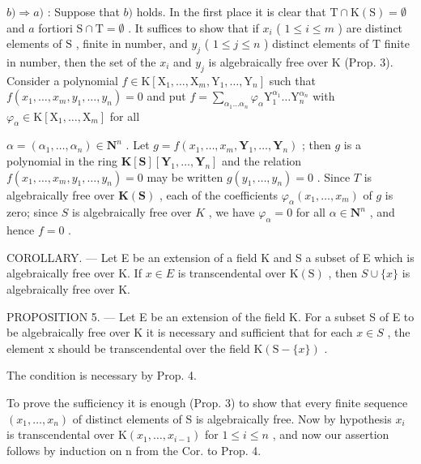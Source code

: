 \(b) \Rightarrow a)\) : Suppose that \(b)\) holds. In the first place it is clear that \(\mathrm{T} \cap \mathrm{K}(\mathrm{S}) = \emptyset\) and \(a\) fortiori \(\mathrm{S} \cap \mathrm{T} = \emptyset\) . It suffices to show that if \(x_i\) ( \(1 \leqslant i \leqslant m\) ) are distinct elements of \(\mathrm{S}\) , finite in number, and \(y_j\) ( \(1 \leqslant j \leqslant n\) ) distinct elements of \(\mathrm{T}\) finite in number, then the set of the \(x_i\) and \(y_j\) is algebraically free over \(\mathrm{K}\) (Prop. 3). Consider a polynomial \(f \in \mathrm{K}[\mathrm{X}_1, \ldots, \mathrm{X}_m, \mathrm{Y}_1, \ldots, \mathrm{Y}_n]\) such that \(f(x_1, \ldots, x_m, y_1, \ldots, y_n) = 0\) and put \(f = \sum_{\alpha_1 \ldots \alpha_n} \varphi_\alpha \mathrm{Y}_1^{\alpha_1} \ldots \mathrm{Y}_n^{\alpha_n}\) with \(\varphi_\alpha \in \mathrm{K}[\mathrm{X}_1, \ldots, \mathrm{X}_m]\) for all

\(\alpha = (\alpha_{1}, \ldots, \alpha_{n}) \in \mathbf{N}^{n}\) . Let \(g = f(x_{1}, \ldots, x_{m}, \mathbf{Y}_{1}, \ldots, \mathbf{Y}_{n})\) ; then \(g\) is a polynomial in the ring \(\mathbf{K}[\mathbf{S}][\mathbf{Y}_{1}, \ldots, \mathbf{Y}_{n}]\) and the relation \(f(x_{1}, \ldots, x_{m}, y_{1}, \ldots, y_{n}) = 0\) may be written \(g(y_{1}, \ldots, y_{n}) = 0\) . Since \(T\) is algebraically free over \(\mathbf{K}(\mathbf{S})\) , each of the coefficients \(\varphi_{\alpha}(x_{1}, \ldots, x_{m})\) of \(g\) is zero; since \(S\) is algebraically free over \(K\) , we have \(\varphi_{\alpha} = 0\) for all \(\alpha \in \mathbf{N}^{n}\) , and hence \(f = 0\) .

COROLLARY. --- Let E be an extension of a field K and S a subset of E which is algebraically free over K. If \(x \in E\) is transcendental over \(\mathrm{K}(\mathrm{S})\) , then \(S \cup \{x\}\) is algebraically free over K.

PROPOSITION 5. --- Let E be an extension of the field K. For a subset S of E to be algebraically free over K it is necessary and sufficient that for each \(x \in S\) , the element x should be transcendental over the field \(\mathrm{K}(\mathrm{S} - \{x\})\) .

The condition is necessary by Prop. 4.

To prove the sufficiency it is enough (Prop. 3) to show that every finite sequence \((x_{1},\ldots,x_{n})\) of distinct elements of S is algebraically free. Now by hypothesis \(x_{i}\) is transcendental over \(\mathrm{K}(x_{1},\ldots,x_{i-1})\) for \(1\leqslant i\leqslant n\) , and now our assertion follows by induction on n from the Cor. to Prop. 4.

